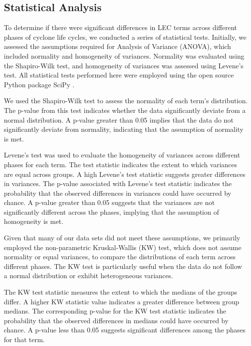 \subsection{Statistical Analysis}

To determine if there were significant differences in LEC terms across different phases of cyclone life cycles, we conducted a series of statistical tests. Initially, we assessed the assumptions required for Analysis of Variance (ANOVA), which included normality and homogeneity of variances. Normality was evaluated using the Shapiro-Wilk test, and homogeneity of variances was assessed using Levene's test. All statistical tests performed here were employed using the open source Python package SciPy \citep{2020SciPy-NMeth}.

We used the Shapiro-Wilk test to assess the normality of each term's distribution. The p-value from this test indicates whether the data significantly deviate from a normal distribution. A p-value greater than 0.05 implies that the data do not significantly deviate from normality, indicating that the assumption of normality is met.

Levene's test was used to evaluate the homogeneity of variances across different phases for each term. The test statistic indicates the extent to which variances are equal across groups. A high Levene's test statistic suggests greater differences in variances. The p-value associated with Levene's test statistic indicates the probability that the observed differences in variances could have occurred by chance. A p-value greater than 0.05 suggests that the variances are not significantly different across the phases, implying that the assumption of homogeneity is met.

Given that many of our data sets did not meet these assumptions, we primarily employed the non-parametric Kruskal-Wallis (KW) test, which does not assume normality or equal variances, to compare the distributions of each term across different phases. The KW test is particularly useful when the data do not follow a normal distribution or exhibit heterogeneous variances.

The KW test statistic measures the extent to which the medians of the groups differ. A higher KW statistic value indicates a greater difference between group medians. The corresponding p-value for the KW test statistic indicates the probability that the observed differences in medians could have occurred by chance. A p-value less than 0.05 suggests significant differences among the phases for that term.

